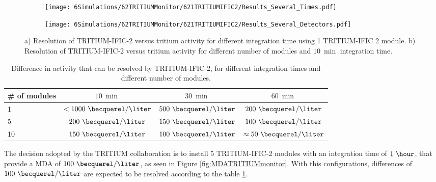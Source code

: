 \begin{figure}
\centering
    \begin{subfigure}[b]{0.75\textwidth}
    \centering
    \texttt{[image: 6Simulations/62TRITIUMMonitor/621TRITIUMIFIC2/Results\_Several\_Times.pdf]}  
    \caption{\label{subfig:ResolutionvsIntegrationCoutingTime}}
    \end{subfigure}
    \hfill
    \begin{subfigure}[b]{0.75\textwidth}
    \centering
    \texttt{[image: 6Simulations/62TRITIUMMonitor/621TRITIUMIFIC2/Results\_Several\_Detectors.pdf]}  
    \caption{\label{subfig:ResolutionvsNumberDetectors}}
    \end{subfigure}
 \caption{a) Resolution of TRITIUM-IFIC-2 versus tritium activity for different integration time using 1 TRITIUM-IFIC 2 module. b) Resolution of TRITIUM-IFIC-2 versus tritium activity for different number of modules and $10~\min$ integration time.}
 \label{fig:Resolution}
\end{figure}

\begin{table}[htbp]
\centering{}%
\begin{tabular}{lccc}
\toprule 
\# of modules & $10~\min$ & $30~\min$ & $60~\min$ \tabularnewline
\midrule
\midrule 
1 & $<1000~\becquerel/\liter$ & $500~\becquerel/\liter$ & $200~\becquerel/\liter$ \tabularnewline
5 & $200~\becquerel/\liter$ & $150~\becquerel/\liter$ & $100~\becquerel/\liter$ \tabularnewline
10 & $150~\becquerel/\liter$ & $100~\becquerel/\liter$ & $\approx 50~\becquerel/\liter$ \tabularnewline
\bottomrule
\end{tabular}
\caption{Difference in activity that can be resolved by TRITIUM-IFIC-2, for different integration times and different number of modules.}
\label{tab:DifferentCasesOfTI2}
\end{table}

The decision adopted by the TRITIUM collaboration is to install 5 TRITIUM-IFIC-2 modules with an integration time of $1~\hour$, that provide a MDA of $100~\becquerel/\liter$, as seen in Figure \ref{fig:MDATRITIUMmonitor}. With this configurations, differences of $100~\becquerel/\liter$ are expected to be resolved according to the table \ref{tab:DifferentCasesOfTI2}. 



